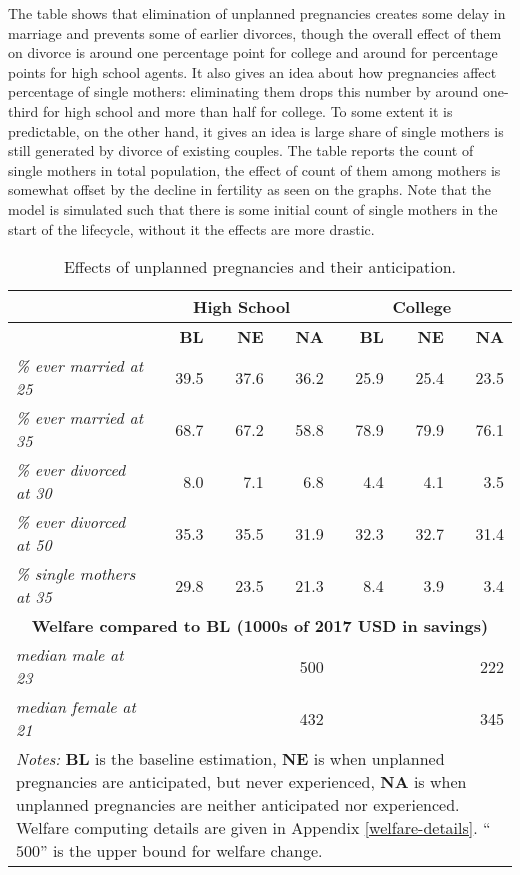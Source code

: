 \documentclass[12pt,letter]{article}
\begin{document}
The table shows that elimination of unplanned pregnancies creates some delay in marriage and prevents some of earlier divorces, though the overall effect of them on divorce is around one percentage point for college and around for percentage points for high school agents. It also gives an idea about how pregnancies affect percentage of single mothers: eliminating them drops this number by around one-third for high school and more than half for college. To some extent it is predictable, on the other hand, it gives an idea is large share of single mothers is still generated by divorce of existing couples. The table reports the count of single mothers in total population, the effect of count of them among mothers is somewhat offset by the decline in fertility as seen on the graphs. Note that the model is simulated such that there is some initial count of single mothers in the start of the lifecycle, without it the effects are more drastic. 

\begin{table}
\begin{center}
\caption{Effects of unplanned pregnancies and their anticipation.\label{upp-table}}
\begin{tabular}{l | r r r | r r r}\hline
& \multicolumn{3}{c|}{\textbf{High School}} & \multicolumn{3}{c}{\textbf{College}} \\\hline
& \textbf{BL} & \textbf{NE} & \textbf{NA} & \textbf{BL} & \textbf{NE} & \textbf{NA} \\\hline
\textit{\% ever married at 25}  & 39.5 & 37.6 & 36.2 & 25.9 & 25.4 & 23.5 \\
\textit{\% ever married at 35}  & 68.7 & 67.2 & 58.8 & 78.9 & 79.9 & 76.1 \\\hline
\textit{\% ever divorced at 30}  & 8.0 & 7.1 & 6.8 & 4.4 & 4.1 & 3.5\\
\textit{\% ever divorced at 50}  & 35.3 & 35.5 & 31.9 & 32.3 & 32.7 & 31.4\\\hline
\textit{\% single mothers at 35}  & 29.8 & 23.5 & 21.3 & 8.4 & 3.9 & 3.4 \\\hline
\multicolumn{7}{c}{\footnotesize \textbf{Welfare compared to BL (1000s of 2017 USD in savings)}}\\\hline
\textit{median male at 23} & &  &  500 &  & &   222 \\
\textit{median female at 21} &  &  &   432 &  &  &   345 \\
\hline
\multicolumn{7}{p{0.675\linewidth}}{\footnotesize \emph{Notes:} \textbf{BL} is the baseline estimation, \textbf{NE} is when unplanned pregnancies are anticipated, but never experienced,  \textbf{NA} is when unplanned pregnancies are neither anticipated nor experienced. Welfare computing details are given in Appendix \ref{welfare-details}. ``$500$'' is the upper bound for welfare change. }\\\hline\hline
\end{tabular}
\end{center}
\end{table}
\end{document}
